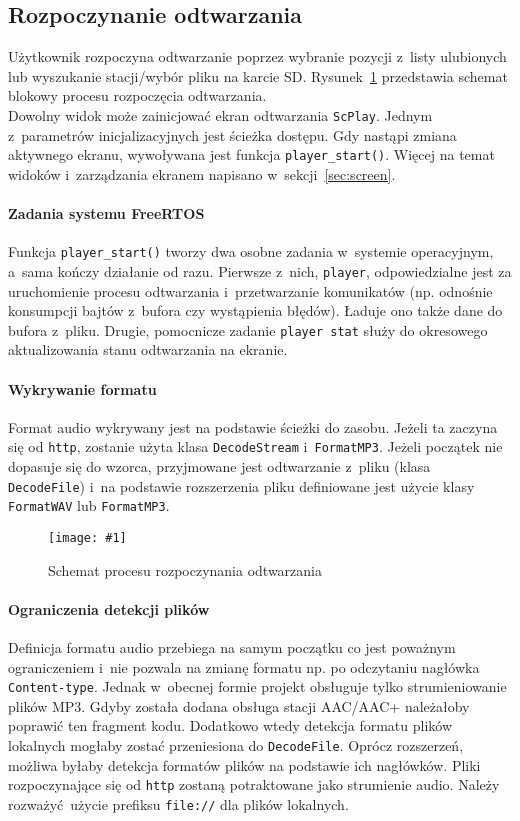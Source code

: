 \documentclass[polish]{aghengthesis}
\newcommand{\imgint}[4]{
	\begin{figure}[{#4}]
		\centering
		\texttt{[image: \#1]}
		\caption{#2}
		\label{#1}
	\end{figure}
}
\newcommand{\imgh}[3]{\imgint{#1}{#2}{#3}{H}}
\begin{document}
		\subsection{Rozpoczynanie odtwarzania}
			Użytkownik rozpoczyna odtwarzanie poprzez wybranie pozycji z~listy ulubionych lub wyszukanie stacji/wybór pliku na karcie SD.
			Rysunek~\ref{3/PicoRadio-start} przedstawia schemat blokowy procesu rozpoczęcia odtwarzania.
			$ $\\
			
			Dowolny widok może zainicjować ekran odtwarzania \lstinline|ScPlay|.
			Jednym z~parametrów inicjalizacyjnych jest ścieżka dostępu. Gdy nastąpi zmiana aktywnego ekranu, wywoływana jest funkcja \lstinline|player_start()|. Więcej na temat widoków i~zarządzania ekranem napisano w~sekcji~\ref{sec:screen}.
			
			\paragraph{Zadania systemu FreeRTOS}
				Funkcja \lstinline|player_start()| tworzy dwa osobne zadania w~systemie operacyjnym, a~sama kończy działanie od razu. Pierwsze z~nich, \lstinline|player|, odpowiedzialne jest za uruchomienie procesu odtwarzania i~przetwarzanie komunikatów (np. odnośnie konsumpcji bajtów z~bufora czy wystąpienia błędów). Ładuje ono także dane do bufora z~pliku. Drugie, pomocnicze zadanie \lstinline|player stat| służy do okresowego aktualizowania stanu odtwarzania na ekranie.
			
			\paragraph{Wykrywanie formatu}
				Format audio wykrywany jest na podstawie ścieżki do zasobu. Jeżeli ta zaczyna się od \lstinline|http|, zostanie użyta klasa \lstinline|DecodeStream| i~\lstinline|FormatMP3|. Jeżeli początek nie dopasuje się do wzorca, przyjmowane jest odtwarzanie z~pliku (klasa \lstinline|DecodeFile|) i~na podstawie rozszerzenia pliku definiowane jest użycie klasy \lstinline|FormatWAV| lub \lstinline|FormatMP3|.
				
			\imgh{3/PicoRadio-start}{Schemat procesu rozpoczynania odtwarzania}{0.7}
				
			\paragraph{Ograniczenia detekcji plików}
				Definicja formatu audio przebiega na samym początku co jest poważnym ograniczeniem i~nie pozwala na zmianę formatu np. po odczytaniu nagłówka \lstinline|Content-type|. Jednak w~obecnej formie projekt obsługuje tylko strumieniowanie plików MP3. Gdyby została dodana obsługa stacji AAC/AAC+ należałoby poprawić ten fragment kodu. Dodatkowo wtedy detekcja formatu plików lokalnych mogłaby zostać przeniesiona do \lstinline|DecodeFile|. Oprócz rozszerzeń, możliwa byłaby detekcja formatów plików na podstawie ich nagłówków. Pliki rozpoczynające się od \lstinline|http| zostaną potraktowane jako strumienie audio. Należy rozważyć użycie prefiksu \lstinline|file://| dla plików lokalnych.
			
\end{document}
